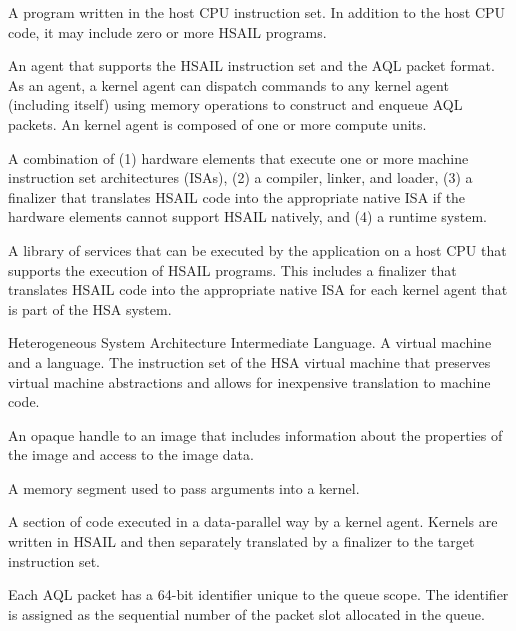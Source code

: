 \documentclass[oneside]{book}
\begin{document}
\begin{description}[itemsep=5pt,leftmargin=0cm, labelindent=0cm]
\item[HSA application] A program written in the host CPU instruction set. In
  addition to the host CPU code, it may include zero or more HSAIL programs.

\item[kernel agent] An agent that supports the HSAIL instruction set and the
  AQL packet format. As an agent, a kernel agent can dispatch commands to
  any kernel agent (including itself) using memory operations to construct and
  enqueue AQL packets. An kernel agent is composed of one or more compute units.

\item[HSA implementation] A combination of (1) hardware elements that execute
  one or more machine instruction set architectures (ISAs), (2) a compiler,
  linker, and loader, (3) a finalizer that translates HSAIL code into the
  appropriate native ISA if the hardware elements cannot support HSAIL
  natively, and (4) a runtime system.

\item[HSA runtime] A library of services that can be executed by the application
  on a host CPU that supports the execution of HSAIL programs. This includes a
  finalizer that translates HSAIL code into the appropriate native ISA for each
  kernel agent that is part of the HSA system.

\item[HSAIL] Heterogeneous System Architecture Intermediate Language. A virtual
  machine and a language. The instruction set of the HSA virtual machine that
  preserves virtual machine abstractions and allows for inexpensive translation
  to machine code.

\item[Image handle] An opaque handle to an image that includes information about
  the properties of the image and access to the image data.

\item[Kernarg segment] A memory segment used to pass arguments into a kernel.

\item[Kernel] A section of code executed in a data-parallel way by a kernel
  agent. Kernels are written in HSAIL and then separately translated by a
  finalizer to the target instruction set.

\item[Packet ID] Each AQL packet has a 64-bit identifier unique to the queue
  scope. The identifier is assigned as the sequential number of the packet slot
  allocated in the queue.


\end{description}
\end{document}
